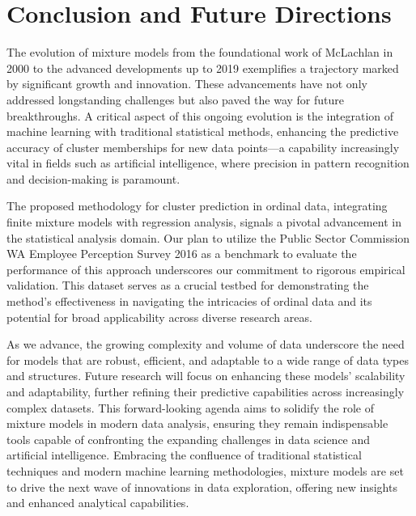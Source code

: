\documentclass{article}
\begin{document}
\section{Conclusion and Future Directions}

The evolution of mixture models from the foundational work of McLachlan in 2000 to the advanced developments up to 2019 exemplifies a trajectory marked by significant growth and innovation. These advancements have not only addressed longstanding challenges but also paved the way for future breakthroughs. A critical aspect of this ongoing evolution is the integration of machine learning with traditional statistical methods, enhancing the predictive accuracy of cluster memberships for new data points—a capability increasingly vital in fields such as artificial intelligence, where precision in pattern recognition and decision-making is paramount.

The proposed methodology for cluster prediction in ordinal data, integrating finite mixture models with regression analysis, signals a pivotal advancement in the statistical analysis domain. Our plan to utilize the Public Sector Commission WA Employee Perception Survey 2016 as a benchmark to evaluate the performance of this approach underscores our commitment to rigorous empirical validation. This dataset serves as a crucial testbed for demonstrating the method's effectiveness in navigating the intricacies of ordinal data and its potential for broad applicability across diverse research areas.

As we advance, the growing complexity and volume of data underscore the need for models that are robust, efficient, and adaptable to a wide range of data types and structures. Future research will focus on enhancing these models' scalability and adaptability, further refining their predictive capabilities across increasingly complex datasets. This forward-looking agenda aims to solidify the role of mixture models in modern data analysis, ensuring they remain indispensable tools capable of confronting the expanding challenges in data science and artificial intelligence. Embracing the confluence of traditional statistical techniques and modern machine learning methodologies, mixture models are set to drive the next wave of innovations in data exploration, offering new insights and enhanced analytical capabilities.

\printbibliography
\end{document}
